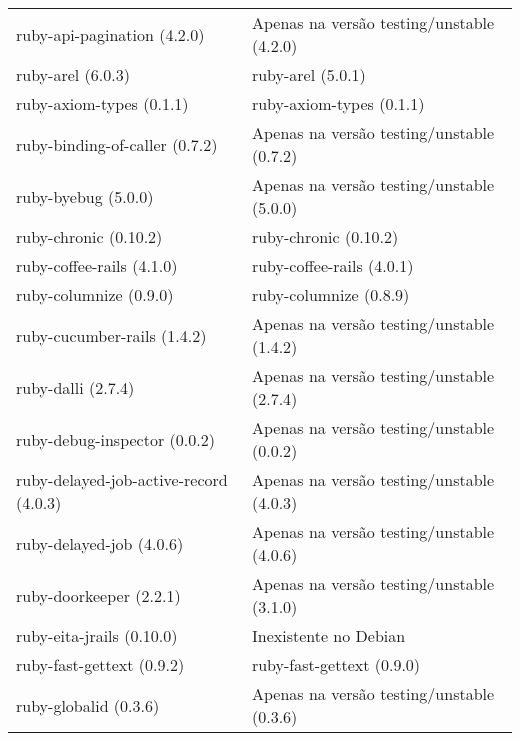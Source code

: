 \begin{table}[H]
\begin{tabular}{l|l}
         ruby-api-pagination (4.2.0)                     & Apenas na versão testing/unstable (4.2.0)  \\ 
        ruby-arel (6.0.3)                                & ruby-arel (5.0.1)                                                 \\ 
        ruby-axiom-types (0.1.1)                         & ruby-axiom-types (0.1.1)                                         \\ 
        ruby-binding-of-caller (0.7.2)                   & Apenas na versão testing/unstable (0.7.2)  \\ 
        ruby-byebug (5.0.0)                              & Apenas na versão testing/unstable (5.0.0)  \\ 
        ruby-chronic (0.10.2)                            & ruby-chronic (0.10.2)                                             \\ 
        ruby-coffee-rails (4.1.0)                        & ruby-coffee-rails (4.0.1)                                         \\ 
        ruby-columnize (0.9.0)                           & ruby-columnize (0.8.9)                                            \\ 
        ruby-cucumber-rails (1.4.2)                      & Apenas na versão testing/unstable (1.4.2)  \\ 
        ruby-dalli (2.7.4)                               & Apenas na versão testing/unstable (2.7.4)  \\ 
        ruby-debug-inspector (0.0.2)                     & Apenas na versão testing/unstable (0.0.2)  \\ 
         ruby-delayed-job-active-record (4.0.3)          & Apenas na versão testing/unstable (4.0.3)  \\ 
        ruby-delayed-job (4.0.6)                         & Apenas na versão testing/unstable (4.0.6)  \\ 
        ruby-doorkeeper (2.2.1)                          & Apenas na versão testing/unstable (3.1.0)  \\ 
        ruby-eita-jrails (0.10.0)                        & Inexistente no Debian                                             \\ 
        ruby-fast-gettext (0.9.2)                        & ruby-fast-gettext (0.9.0)                                         \\ 
        ruby-globalid (0.3.6)                            & Apenas na versão testing/unstable (0.3.6)  \\ 

\end{tabular}
\end{table}
